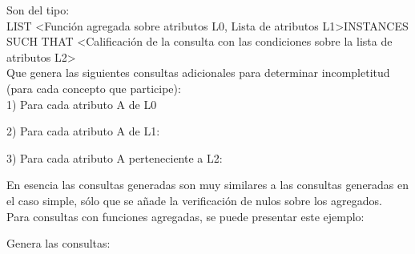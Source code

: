 Son del tipo: \\

LIST \textless Función agregada sobre atributos L0, Lista de atributos L1\textgreater INSTANCES \\
SUCH THAT \textless Calificación de la consulta con las condiciones sobre la lista de atributos L2\textgreater \\

	Que genera las siguientes consultas adicionales para determinar incompletitud (para cada concepto que participe): \\

1) Para cada atributo A de L0 


2) Para cada atributo A de L1:


3)  Para cada atributo A perteneciente a L2: 


	En esencia las consultas generadas son muy similares a las consultas generadas en el caso simple, sólo que se añade la  verificación de nulos sobre los agregados. \\

	Para consultas con funciones agregadas, se puede presentar este ejemplo: 
	

Genera las consultas: 



